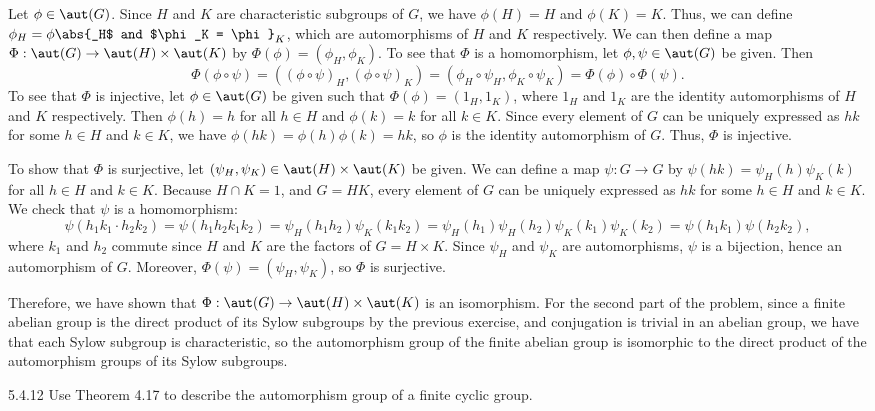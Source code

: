\begin{sol}
    Let $\phi \in \aut(G)$.
	Since $H$ and $K$ are characteristic subgroups of $G$, we have $\phi(H) = H$ and $\phi(K) = K$.
	Thus, we can define $\phi_H = \phi\abs{_H$ and $\phi_K = \phi}_K$, which are automorphisms of $H$ and $K$ respectively.
	We can then define a map $\Phi: \aut(G) \to \aut(H) \times \aut(K)$ by $\Phi(\phi) = (\phi_H, \phi_K)$.
	To see that $\Phi$ is a homomorphism, let $\phi, \psi \in \aut(G)$ be given.
	Then
    \[
    	\Phi(\phi \circ \psi) = ((\phi \circ \psi)_H, (\phi \circ \psi)_K) = (\phi_H \circ \psi_H, \phi_K \circ \psi_K) = \Phi(\phi) \circ \Phi(\psi).
    \]
    To see that $\Phi$ is injective, let $\phi \in \aut(G)$ be given such that $\Phi(\phi) = (1_H, 1_K)$, where $1_H$ and $1_K$ are the identity automorphisms of $H$ and $K$ respectively.
	Then $\phi(h) = h$ for all $h \in H$ and $\phi(k) = k$ for all $k \in K$.
	Since every element of $G$ can be uniquely expressed as $hk$ for some $h \in H$ and $k \in K$, we have $\phi(hk) = \phi(h)\phi(k) = hk$, so $\phi$ is the identity automorphism of $G$.
	Thus, $\Phi$ is injective.

    To show that $\Phi$ is surjective, let $(\psi_H, \psi_K) \in \aut(H) \times \aut(K)$ be given.
	We can define a map $\psi: G \to G$ by $\psi(hk) = \psi_H(h)\psi_K(k)$ for all $h \in H$ and $k \in K$.
	Because $H \cap K = 1$, and $G = HK$, every element of $G$ can be uniquely expressed as $hk$ for some $h \in H$ and $k \in K$.
	We check that $\psi$ is a homomorphism:
    \[
    	\psi(h_1k_1 \cdot h_2k_2) = \psi(h_1h_2k_1k_2) = \psi_H(h_1h_2)\psi_K(k_1k_2) = \psi_H(h_1)\psi_H(h_2)\psi_K(k_1)\psi_K(k_2) = \psi(h_1k_1)\psi(h_2k_2),
    \]
    where $k_1$ and $h_2$ commute since $H$ and $K$ are the factors of $G = H \times K$.
	Since $\psi_H$ and $\psi_K$ are automorphisms, $\psi$ is a bijection, hence an automorphism of $G$.
	Moreover, $\Phi(\psi) = (\psi_H, \psi_K)$, so $\Phi$ is surjective.

    Therefore, we have shown that $\Phi: \aut(G) \to \aut(H) \times \aut(K)$ is an isomorphism.
	For the second part of the problem, since a finite abelian group is the direct product of its Sylow subgroups by the previous exercise, and conjugation is trivial in an abelian group, we have that each Sylow subgroup is characteristic, so the automorphism group of the finite abelian group is isomorphic to the direct product of the automorphism groups of its Sylow subgroups.
\end{sol}

\begin{exercise}{5.4.12}
    Use Theorem 4.17 to describe the automorphism group of a finite cyclic group.
\end{exercise}


